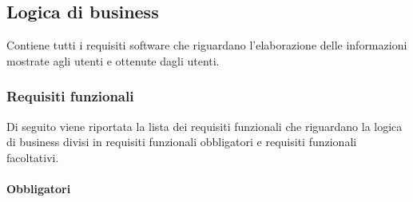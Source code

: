 \subsection{Logica di business}
Contiene tutti i requisiti software che riguardano l'elaborazione delle informazioni mostrate agli utenti e ottenute dagli utenti.

\subsubsection{Requisiti funzionali}
Di seguito viene riportata la lista dei requisiti funzionali che riguardano la logica di business divisi in requisiti funzionali obbligatori e requisiti funzionali facoltativi.


\paragraph{Obbligatori}
